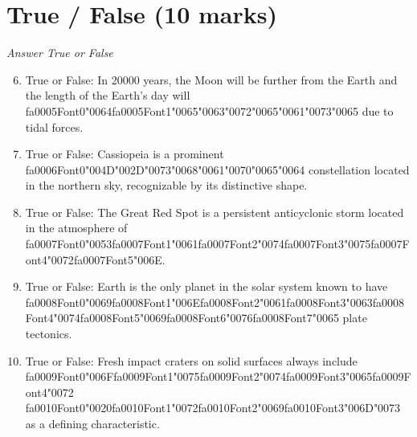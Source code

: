 \documentclass[12pt]{article}
\begin{document}
\section*{True / False (10 marks)}
\textit{Answer True or False}
\begin{enumerate}[label=\arabic*.]
\setcounter{enumi}{5}
\item True or False: In 20000 years, the Moon will be further from the Earth and the length of the Earth's day will {\csname fa0005Font0\endcsname\char"0064}{\csname fa0005Font1\endcsname\char"0065}{\char"0063}{\char"0072}{\char"0065}{\char"0061}{\char"0073}{\char"0065} due to tidal forces.
\item True or False: Cassiopeia is a prominent {\csname fa0006Font0\endcsname\char"004D}{\char"002D}{\char"0073}{\char"0068}{\char"0061}{\char"0070}{\char"0065}{\char"0064} constellation located in the northern sky, recognizable by its distinctive shape.
\item True or False: The Great Red Spot is a persistent anticyclonic storm located in the atmosphere of {\csname fa0007Font0\endcsname\char"0053}{\csname fa0007Font1\endcsname\char"0061}{\csname fa0007Font2\endcsname\char"0074}{\csname fa0007Font3\endcsname\char"0075}{\csname fa0007Font4\endcsname\char"0072}{\csname fa0007Font5\endcsname\char"006E}.
\item True or False: Earth is the only planet in the solar system known to have {\csname fa0008Font0\endcsname\char"0069}{\csname fa0008Font1\endcsname\char"006E}{\csname fa0008Font2\endcsname\char"0061}{\csname fa0008Font3\endcsname\char"0063}{\csname fa0008Font4\endcsname\char"0074}{\csname fa0008Font5\endcsname\char"0069}{\csname fa0008Font6\endcsname\char"0076}{\csname fa0008Font7\endcsname\char"0065} plate tectonics.
\item True or False: Fresh impact craters on solid surfaces always include {\csname fa0009Font0\endcsname\char"006F}{\csname fa0009Font1\endcsname\char"0075}{\csname fa0009Font2\endcsname\char"0074}{\csname fa0009Font3\endcsname\char"0065}{\csname fa0009Font4\endcsname\char"0072} {\csname fa0010Font0\endcsname\char"0020}{\csname fa0010Font1\endcsname\char"0072}{\csname fa0010Font2\endcsname\char"0069}{\csname fa0010Font3\endcsname\char"006D}{\char"0073} as a defining characteristic.
\end{enumerate}
\end{document}
